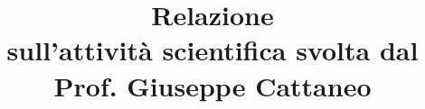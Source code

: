 \documentclass[11pt]{article}
\title{{\sffamily\bfseries {\Huge Relazione\\} \medskip
 {\large sull'attivit\`a scientifica svolta dal\\
   Prof. Giuseppe Cattaneo\\}
   {\normalsize \periodo}}}
\begin{document}

\nocite{*}

%
%

%
\end{document}
